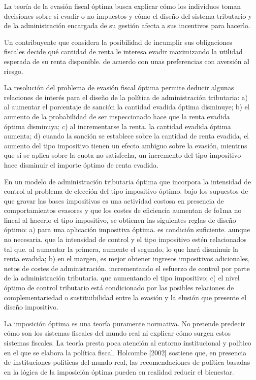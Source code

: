 \documentclass[10pt,a4paper]{article}
\newcommand{\puntosclave}[1]{%
  \begin{tcolorbox}[
    colframe=black,
    title={Puntos clave},
    before upper={\setlength{\parindent}{0.5cm}\setlength{\parskip}{0.5\baselineskip}}
  ]
  #1
  \end{tcolorbox}
}
\begin{document}
\puntosclave{
    La teoría de la evasión fiscal óptima busca explicar cómo los individuos toman decisiones sobre si evadir o no impuestos y cómo el diseño del sistema tributario y de la administración encargada de su gestión afecta a sus incentivos para hacerlo.
    
    Un contribuyente que considera la posibilidad de incumplir sus obligaciones fiscales decide qué cantidad de renta le interesa evadir maximizando la utilidad esperada de su renta disponible. de acuerdo con unas preferencias con aversión al riesgo.
    
    La resolución del problema de evasión fiscal óptima permite deducir algunas relaciones de interés para el diseño de la política de administración tributaria: a) al aumentar el porcentaje de sanción la cantidad evadida óptima disminuye; b) el aumento de la probabilidad de ser inspeccionado hace que la renta evadida óptima disminuya; c) al incrementarse la renta. la cantidad evadida óptima aumenta; d) cuando la sanción se establece sobre la cantidad de renta evadida, el aumento del tipo impositivo tienen un efecto ambiguo sobre la evasión, mientrns que si se aplica sobre la cuota no satisfecha, un incremento del tipo impositivo hace disminuir el importe óptimo de renta evadida.

    En un modelo de administración tributaria óptima que incorpora la intensidad de control al problema de elección del tipo impositivo óptimo. bajo los supuestos de que gravar las bases impositivas es una actividad costosa en presencia de comportamientos evasores y que los costes de eficiencia aumentan de fo1ma no lineal al hacerlo el tipo impositivo, se obtienen las siguientes reglas de diseño óptimo: a) para una aplicación impositiva óptima. es condición suficiente. aunque no necesaria. que la intensidad de control y el tipo impositivo estén relacionados tal que. al aumentar la primera, aumente el segundo, lo que hará disminuir la renta evadida; b) en el margen, es mejor obtener ingresos impositivos adicionales, netos de costes de administración. incrementando el esfuerzo de control por parte de la administración tributaria. que aumentando el tipo impositivo; c) el nivel óptimo de control tributario está condicionado por las posibles relaciones de complementariedad o sustituibilidad entre la evasión y la elusión que presente el diseño impositivo.
}


La imposición óptima es una teoría puramente normativa. No pretende predecir cómo son los sistemas fiscales del mundo real ni explicar cómo surgen estos sistemas fiscales. La teoría presta poca atención al entorno institucional y político en el que se elabora la política fiscal. Holcombe [2002] sostiene que, en presencia de instituciones políticas del mundo real, las recomendaciones de política basadas en la lógica de la imposición óptima pueden en realidad reducir el bienestar.
\end{document}

